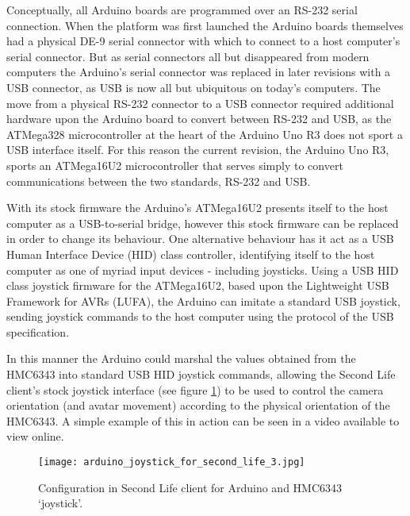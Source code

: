 Conceptually, all Arduino boards are programmed over an RS-232 serial connection. When the platform was first launched the Arduino boards themselves had a physical DE-9 serial connector with which to connect to a host computer's serial connector. But as serial connectors all but disappeared from modern computers the Arduino's serial connector was replaced in later revisions with a USB connector, as USB is now all but ubiquitous on today's computers. The move from a physical RS-232 connector to a USB connector required additional hardware upon the Arduino board to convert between RS-232 and USB, as the ATMega328\atmegaTFootnote{} microcontroller at the heart of the Arduino Uno R3 does not sport a USB interface itself. For this reason the current revision, the Arduino Uno R3, sports an ATMega16U2\atmegaFootnote{} microcontroller that serves simply to convert communications between the two standards, RS-232 and USB.

With its stock firmware the Arduino's ATMega16U2 presents itself to the host computer as a USB-to-serial bridge, however this stock firmware can be replaced in order to change its behaviour. One alternative behaviour has it act as a USB Human Interface Device (HID) class controller, identifying itself to the host computer as one of myriad input devices - including joysticks. Using a USB HID class joystick firmware for the ATMega16U2\arduinousbhidFootnote{}, based upon the Lightweight USB Framework for AVRs (LUFA)\lufaFootnote{}, the Arduino can imitate a standard USB joystick, sending joystick commands to the host computer using the protocol of the USB specification.


In this manner the Arduino could marshal the values obtained from the HMC6343 into standard USB HID joystick commands, allowing the Second Life client's stock joystick interface (see figure \ref{arduino_joystick_for_second_life_3.jpg}) to be used to control the camera orientation (and avatar movement) according to the physical orientation of the HMC6343. A simple example of this in action can be seen in a video available to view online\ArduinoJoystickVideoFootnote{}.

\begin{figure}[h]
\centering
  \texttt{[image: arduino\_joystick\_for\_second\_life\_3.jpg]}
  \caption{Configuration in Second Life client for Arduino and HMC6343 `joystick'.}
  \label{arduino_joystick_for_second_life_3.jpg}
\end{figure}

